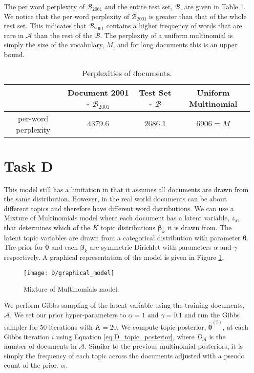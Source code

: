 \documentclass[11pt]{article}
\begin{document}
The per word perplexity of $\mathcal{B}_{2001}$ and the entire test set, $\mathcal{B}$, are given in Table \ref{tab:C_perplexity}. We notice that the per word perplexity of $\mathcal{B}_{2001}$ is greater than that of the whole test set. This indicates that $\mathcal{B}_{2001}$ contains a higher frequency of words that are rare in $\mathcal{A}$ than the rest of the $\mathcal{B}$. The perplexity of a uniform multinomial is simply the size of the vocabulary, $M$, and for long documents this is an upper bound.

\begin{table}
    \centering
    \begin{tabular}{|c|ccc|}
        \hline
         & Document 2001 - $\mathcal{B}_{2001}$ & Test Set - $\mathcal{B}$ & Uniform Multinomial \\
        \hline
        per-word perplexity & $4379.6$ & $2686.1$ & $6906 = M$ \\
        \hline
    \end{tabular}
    \caption{Perplexities of documents.}
    \label{tab:C_perplexity}
\end{table}

\section{Task D}
This model still has a limitation in that it assumes all documents are drawn from the same distribution. However, in the real world documents can be about different topics and therefore have different word distributions. We can use a Mixture of Multinomials model where each document has a latent variable, $z_d$, that determines which of the $K$ topic distributions $\boldsymbol{\beta}_k$ it is drawn from. The latent topic variables are drawn from a categorical distribution with parameter $\boldsymbol{\theta}$. The prior for $\boldsymbol{\theta}$ and each $\boldsymbol{\beta}_k$ are symmetric Dirichlet with parameters $\alpha$ and $\gamma$ respectively. A graphical representation of the model is given in Figure \ref{fig:D_graphical_model}.

\begin{figure}
    \centering
    \texttt{[image: D/graphical\_model]}
    \caption{Mixture of Multinomials model.}
    \label{fig:D_graphical_model}
\end{figure}
We perform Gibbs sampling of the latent variable using the training documents, $\mathcal{A}$. We set our prior hyper-parameters to $\alpha = 1$ and $\gamma = 0.1$ and run the Gibbs sampler for $50$ iterations with $K=20$. We compute topic posterior, $\boldsymbol{\hat \theta}^{(i)}$, at each Gibbs iteration $i$ using Equation \ref{eq:D_topic_posterior}, where $D_{\mathcal{A}}$ is the number of documents in $\mathcal{A}$. Similar to the previous multinomial posteriors, it is simply the frequency of each topic across the documents adjusted with a pseudo count of the prior, $\alpha$.
\end{document}
